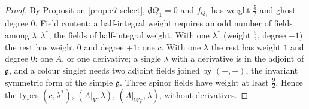 \begin{proof}
By Proposition \ref{prop:c7-select}, ${\not d}Q_1=0$ and $f_{Q_1}$ has weight $\tfrac52$ and ghost degree $0$. Field content: a half-integral weight requires an odd number of fields among $\lambda,\lambda^*$, the fields of half-integral weight. With one $\lambda^*$ (weight $\tfrac52$, degree $-1$) the rest has weight $0$ and degree $+1$: one $c$. With one $\lambda$ the rest has weight $1$ and degree $0$: one $A$, or one derivative; a single $\lambda$ with a derivative is in the adjoint of $\mathfrak g$, and a colour singlet needs two adjoint fields joined by $(-,-)$, the invariant symmetric form of the simple $\mathfrak g$. Three spinor fields have weight at least $\tfrac92$. Hence the types $(c,\lambda^*)$, $(A|_V,\lambda)$, $(A|_{W_{\mathbb R}^\perp},\lambda)$, without derivatives.


\end{proof}
